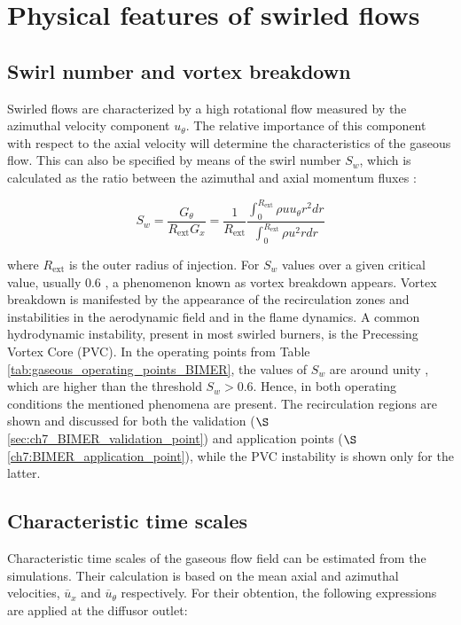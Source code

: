 \section{Physical features of swirled flows}

\subsection{Swirl number and vortex breakdown}
\label{subsec:BIMER_ch7_sw_vortex_breakdown}

Swirled flows are characterized by a high rotational flow measured by the azimuthal velocity component $u_\theta$. The relative importance of this component with respect to the axial velocity will determine the characteristics of the gaseous flow. This can also be specified by means of the swirl number $S_w$, which is calculated as the ratio between the azimuthal and axial momentum fluxes :

\begin{equation}
S_w = \frac{G_\theta}{R_\mathrm{ext} G_x} = \frac{1}{R_\mathrm{ext}} \frac{\int_0^{R_\mathrm{ext}} \rho u u_\theta r^2 dr}{\int_0^{R_\mathrm{ext}} \rho u^2 r dr}
\end{equation}

where $R_\mathrm{ext}$ is the outer radius of injection. For $S_w$ values over a given critical value, usually 0.6 , a phenomenon known as vortex breakdown appears. Vortex breakdown is manifested by the appearance of the recirculation zones and instabilities in the aerodynamic field and in the flame dynamics. A common hydrodynamic instability, present in most swirled burners, is the Precessing Vortex Core (PVC). In the operating points from Table \ref{tab:gaseous_operating_points_BIMER}, the values of $S_w$ are around unity , which are higher than the threshold $S_w > 0.6$. Hence, in both operating conditions the mentioned phenomena are present. The recirculation regions are shown and discussed for both the validation ($\S$\ref{sec:ch7_BIMER_validation_point}) and application points ($\S$\ref{ch7:BIMER_application_point}), while the PVC instability is shown only for the latter.

\subsection{Characteristic time scales}

Characteristic time scales of the gaseous flow field can be estimated from the simulations. Their calculation is based on the mean axial and azimuthal velocities, $\overline{u}_x$ and $\overline{u}_\theta$ respectively. For their obtention, the following expressions are applied at the diffusor outlet:

